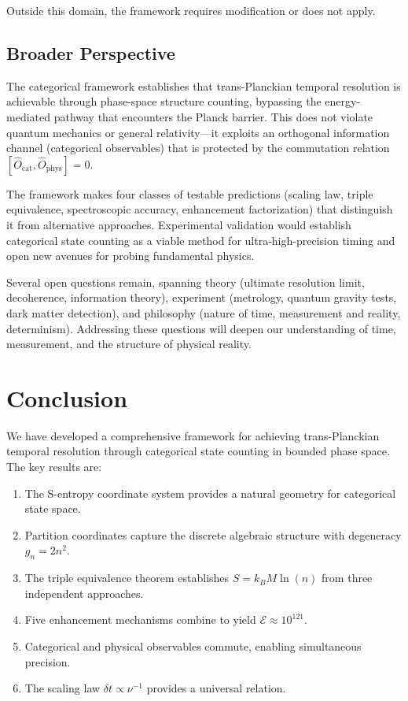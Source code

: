 \documentclass[twocolumn,10pt]{article}
\theoremstyle{remark}
\begin{document}
Outside this domain, the framework requires modification or does not apply.


\subsection{Broader Perspective}

The categorical framework establishes that trans-Planckian temporal resolution is achievable through phase-space structure counting, bypassing the energy-mediated pathway that encounters the Planck barrier. This does not violate quantum mechanics or general relativity—it exploits an orthogonal information channel (categorical observables) that is protected by the commutation relation $[\hat{O}_{\text{cat}}, \hat{O}_{\text{phys}}] = 0$.

The framework makes four classes of testable predictions (scaling law, triple equivalence, spectroscopic accuracy, enhancement factorization) that distinguish it from alternative approaches. Experimental validation would establish categorical state counting as a viable method for ultra-high-precision timing and open new avenues for probing fundamental physics.

Several open questions remain, spanning theory (ultimate resolution limit, decoherence, information theory), experiment (metrology, quantum gravity tests, dark matter detection), and philosophy (nature of time, measurement and reality, determinism). Addressing these questions will deepen our understanding of time, measurement, and the structure of physical reality.


\section{Conclusion}

We have developed a comprehensive framework for achieving trans-Planckian temporal resolution through categorical state counting in bounded phase space. The key results are:

\begin{enumerate}
    \item The S-entropy coordinate system provides a natural geometry for categorical state space.
    \item Partition coordinates capture the discrete algebraic structure with degeneracy $g_n = 2n^2$.
    \item The triple equivalence theorem establishes $S = k_B M \ln(n)$ from three independent approaches.
    \item Five enhancement mechanisms combine to yield $\mathcal{E} \approx 10^{121}$.
    \item Categorical and physical observables commute, enabling simultaneous precision.
    \item The scaling law $\delta t \propto \nu^{-1}$ provides a universal relation.
\end{enumerate}
\end{document}
